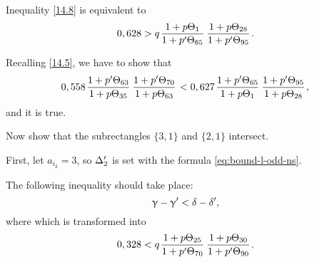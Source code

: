 Inequality \ref{14.8} is equivalent to
\begin{equation}
	0,628 > q \up{1}{65} \up{28}{95}.
\end{equation}

Recalling \ref{14.5}, we have to show that
\begin{equation*}
	0,558 \pu{63}{35} \pu{70}{63}
	< 0,627 \pu{65}{1} \pu{95}{28},
\end{equation*}
and it is true.

Now show that the subrectangles $\{3,1\}$ and $\{2, 1\}$ intersect.

First, let $a_{i_2} = 3$, so $\Delta_2'$ is set with the formula \ref{eq:bound-l-odd-ns}.

The following inequality should take place:
\begin{equation*}
	\upgamma - \upgamma' < \delta - \delta',
\end{equation*}
where
which is transformed into
\begin{equation}
	0,328 < q \up{25}{70} \up{30}{90}.
\end{equation}


